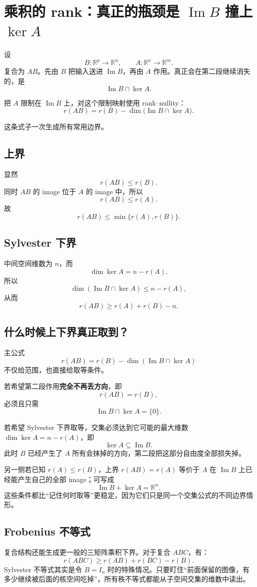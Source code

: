 \documentclass[11pt,a4paper]{ctexart}
\newcommand{\kw}[1]{\textbf{\color{deep}#1}}
\begin{document}
\section{乘积的 rank：真正的瓶颈是 $\operatorname{Im}B$ 撞上 $\ker A$}

设
\[
B:\mathbb R^p\to\mathbb R^n,
\qquad
A:\mathbb R^n\to\mathbb R^m.
\]
复合为 $AB$。先由 $B$ 把输入送进 $\operatorname{Im}B$，再由 $A$ 作用。真正会在第二段继续消失的，是
\[
\operatorname{Im}B\cap\ker A.
\]

把 $A$ 限制在 $\operatorname{Im}B$ 上，对这个限制映射使用 rank--nullity：
\[
\boxed{
r(AB)
=r(B)-\dim\bigl(\operatorname{Im}B\cap\ker A\bigr).
}
\]

这条式子一次生成所有常用边界。

\subsection{上界}
显然
\[
r(AB)\le r(B).
\]
同时 $AB$ 的 image 位于 $A$ 的 image 中，所以
\[
r(AB)\le r(A).
\]
故
\[
\boxed{r(AB)\le\min\{r(A),r(B)\}.}
\]

\subsection{Sylvester 下界}
中间空间维数为 $n$，而
\[
\dim\ker A=n-r(A).
\]
所以
\[
\dim(\operatorname{Im}B\cap\ker A)
\le n-r(A),
\]
从而
\[
\boxed{r(AB)\ge r(A)+r(B)-n.}
\]

\subsection{什么时候上下界真正取到？}
主公式
\[
r(AB)=r(B)-\dim(\operatorname{Im}B\cap\ker A)
\]
不仅给范围，也直接给取等条件。

若希望第二段作用\kw{完全不再丢方向}，即
\[
r(AB)=r(B),
\]
必须且只需
\[
\boxed{\operatorname{Im}B\cap\ker A=\{0\}.}
\]

若希望 Sylvester 下界取等，交集必须达到它可能的最大维数 $\dim\ker A=n-r(A)$，即
\[
\boxed{\ker A\subseteq\operatorname{Im}B.}
\]
此时 $B$ 已经产生了 $A$ 所有会抹掉的方向，第二段把这部分自由度全部损失掉。

另一侧若已知 $r(A)\le r(B)$，上界 $r(AB)=r(A)$ 等价于 $A$ 在 $\operatorname{Im}B$ 上已经能产生自己的全部 image；可写成
\[
\boxed{\operatorname{Im}B+\ker A=\mathbb R^n.}
\]
这些条件都比“记住何时取等”更稳定，因为它们只是同一个交集公式的不同边界情形。

\subsection{Frobenius 不等式}
复合结构还能生成更一般的三矩阵乘积下界。对于复合 $ABC$，有：
\[
\boxed{r(ABC) \ge r(AB) + r(BC) - r(B).}
\]
Sylvester 不等式其实是令 $B = I_n$ 时的特殊情况。只要盯住“前面保留的图像，有多少继续被后面的核空间吃掉”，所有秩不等式都能从子空间交集的维数中读出。
\end{document}
